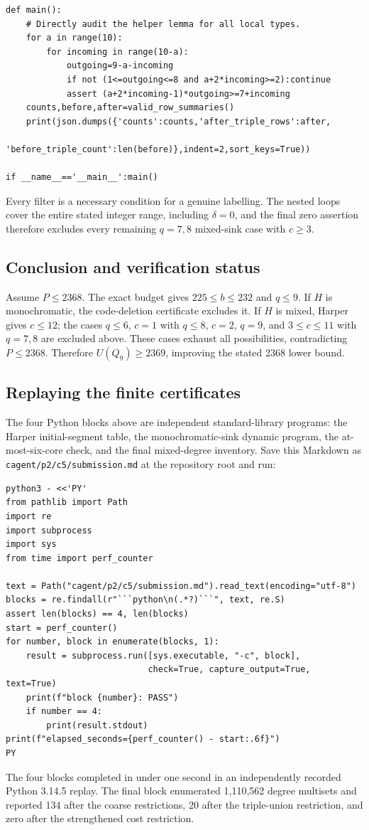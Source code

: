 \documentclass[11pt,a4paper]{article}
\begin{document}
\begin{Verbatim}[breaklines,breakanywhere,fontsize=\footnotesize]
def main():
    # Directly audit the helper lemma for all local types.
    for a in range(10):
        for incoming in range(10-a):
            outgoing=9-a-incoming
            if not (1<=outgoing<=8 and a+2*incoming>=2):continue
            assert (a+2*incoming-1)*outgoing>=7+incoming
    counts,before,after=valid_row_summaries()
    print(json.dumps({'counts':counts,'after_triple_rows':after,
                      'before_triple_count':len(before)},indent=2,sort_keys=True))

if __name__=='__main__':main()
\end{Verbatim}

Every filter is a necessary condition for a genuine labelling. The nested loops cover the entire stated integer range, including \(\delta=0\), and the final zero assertion therefore excludes every remaining \(q=7,8\) mixed-sink case with \(c\ge3\).

\subsection{Conclusion and verification status}\label{conclusion-and-verification-status}

Assume \(P\le2368\). The exact budget gives \(225\le b\le232\) and \(q\le9\). If \(H\) is monochromatic, the code-deletion certificate excludes it. If \(H\) is mixed, Harper gives \(c\le12\); the cases \(q\le6\), \(c=1\) with \(q\le8\), \(c=2\), \(q=9\), and \(3\le c\le11\) with \(q=7,8\) are excluded above. These cases exhaust all possibilities, contradicting \(P\le2368\). Therefore \textbf{\(U(Q_9)\ge2369\)}, improving the stated 2368 lower bound.

\subsection{Replaying the finite certificates}\label{replaying-the-finite-certificates}

The four Python blocks above are independent standard-library programs: the Harper initial-segment table, the monochromatic-sink dynamic program, the at-most-six-core check, and the final mixed-degree inventory. Save this Markdown as \texttt{cagent/p2/c5/submission.md} at the repository root and run:

\begin{Verbatim}[breaklines,breakanywhere,fontsize=\footnotesize]
python3 - <<'PY'
from pathlib import Path
import re
import subprocess
import sys
from time import perf_counter

text = Path("cagent/p2/c5/submission.md").read_text(encoding="utf-8")
blocks = re.findall(r"```python\n(.*?)```", text, re.S)
assert len(blocks) == 4, len(blocks)
start = perf_counter()
for number, block in enumerate(blocks, 1):
    result = subprocess.run([sys.executable, "-c", block],
                            check=True, capture_output=True, text=True)
    print(f"block {number}: PASS")
    if number == 4:
        print(result.stdout)
print(f"elapsed_seconds={perf_counter() - start:.6f}")
PY
\end{Verbatim}

The four blocks completed in under one second in an independently recorded Python 3.14.5 replay. The final block enumerated 1,110,562 degree multisets and reported 134 after the coarse restrictions, 20 after the triple-union restriction, and zero after the strengthened cost restriction.
\end{document}
